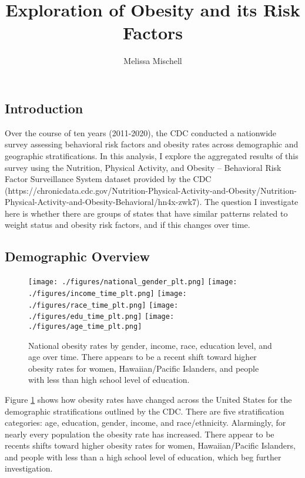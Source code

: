\documentclass[11pt]{article}
\title{Exploration of Obesity and its Risk Factors}
\author{Melissa Mischell}
\begin{document}
\maketitle

\subsection{Introduction}
Over the course of ten years (2011-2020), the CDC conducted a nationwide survey assessing behavioral risk factors and obesity rates across demographic and geographic stratifications. In this analysis, I explore the aggregated results of this survey using the Nutrition, Physical Activity, and Obesity – Behavioral Risk Factor Surveillance System dataset provided by the CDC (https://chronicdata.cdc.gov/Nutrition-Physical-Activity-and-Obesity/Nutrition-Physical-Activity-and-Obesity-Behavioral/hn4x-zwk7). The question I investigate here is whether there are groups of states that have similar patterns related to weight status and obesity risk factors, and if this changes over time. 

\subsection{Demographic Overview}

\begin{figure}[hp]
\texttt{[image: ./figures/national\_gender\_plt.png]}
\texttt{[image: ./figures/income\_time\_plt.png]}
\texttt{[image: ./figures/race\_time\_plt.png]}
\texttt{[image: ./figures/edu\_time\_plt.png]}
\texttt{[image: ./figures/age\_time\_plt.png]}
\caption{National obesity rates by gender, income, race, education level, and age over time. There appears to be a recent shift toward higher obesity rates for women, Hawaiian/Pacific Islanders, and people with less than high school level of education. 
}
\label{fig:dems_by_time}
\end{figure}

Figure \ref{fig:dems_by_time} shows how obesity rates have changed across the United States for the demographic stratifications outlined by the CDC. There are five stratification categories: age, education, gender, income, and race/ethnicity. Alarmingly, for nearly every population the obesity rate has increased. There appear to be recents shifts toward higher obesity rates for women, Hawaiian/Pacific Islanders, and people with less than a high school level of education, which beg further investigation.
\end{document}
